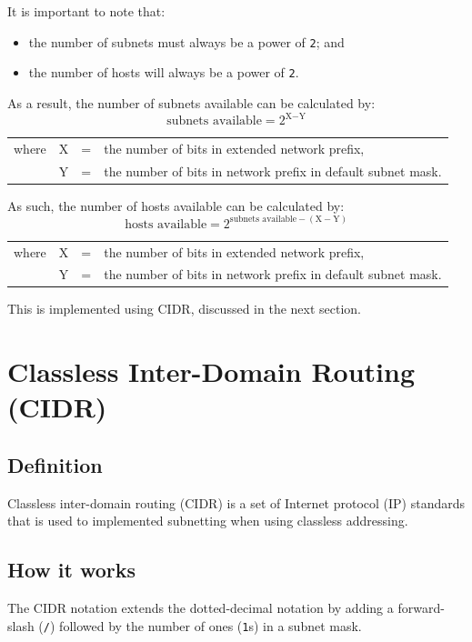 \documentclass[a4paper]{systems-software}
\begin{document}
It is important to note that:
\begin{itemize}
	\item the number of subnets must always be a power of \texttt{2}; and
	\item the number of hosts will always be a power of \texttt{2}.
\end{itemize}
As a result, the number of subnets available can be calculated by:
\begin{equation*}
\text{subnets available} = 2^{\text{X} - \text{Y}}
\end{equation*}
\begin{longtabu} to \textwidth {X[0.3,l] X[0.1,l] X[0.1,l] X[3,l]}
	where & X & = & the number of bits in extended network prefix, \\
	      & Y & = & the number of bits in network prefix in default subnet mask.
\end{longtabu}
As such, the number of hosts available can be calculated by:
\begin{equation*}
\text{hosts available} = 2^{\text{subnets available} - (\text{X} - \text{Y})}
\end{equation*}
\begin{longtabu} to \textwidth {X[0.3,l] X[0.1,l] X[0.1,l] X[3,l]}
	where & X & = & the number of bits in extended network prefix, \\
	& Y & = & the number of bits in network prefix in default subnet mask.
\end{longtabu}

This is implemented using CIDR, discussed in the next section.


\section*{Classless Inter-Domain Routing (CIDR)}

\subsection*{Definition}

Classless inter-domain routing (CIDR) is a set of Internet protocol (IP) standards that is used to implemented subnetting when using classless addressing.


\subsection*{How it works}

The CIDR notation extends the dotted-decimal notation by adding a forward-slash (\texttt{/}) followed by the number of ones (\texttt{1}s) in a subnet mask.
\end{document}
